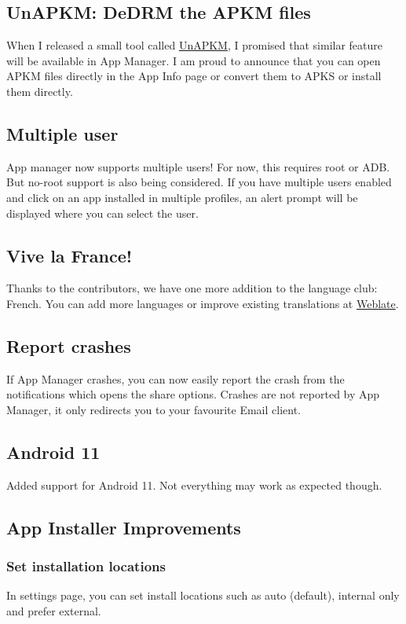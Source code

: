 \subsection{UnAPKM: DeDRM the APKM files}\label{subsec:unapkm:-dedrm-the-apkm-files}
When I released a small tool called \href{https://f-droid.org/en/packages/io.github.muntashirakon.unapkm}{UnAPKM},
I promised that similar feature will be available in App Manager. I am proud to announce that you can open APKM files
directly in the App Info page or convert them to APKS or install them directly.

\subsection{Multiple user}\label{subsec:multiple-user}
App manager now supports multiple users! For now, this requires root or ADB. But no-root support is also being
considered. If you have multiple users enabled and click on an app installed in multiple profiles, an alert prompt will
be displayed where you can select the user.

\subsection{Vive la France!}
Thanks to the contributors, we have one more addition to the language club: French. You can add more languages or
improve existing translations at \href{https://hosted.weblate.org/engage/app-manager}{Weblate}.

\subsection{Report crashes}
If App Manager crashes, you can now easily report the crash from the notifications which opens the share options.
Crashes are not reported by App Manager, it only redirects you to your favourite Email client.

\subsection{Android 11}
Added support for Android 11. Not everything may work as expected though.

\subsection{App Installer Improvements}

\subsubsection{Set installation locations}
In settings page, you can set install locations such as auto (default), internal only and prefer external.

